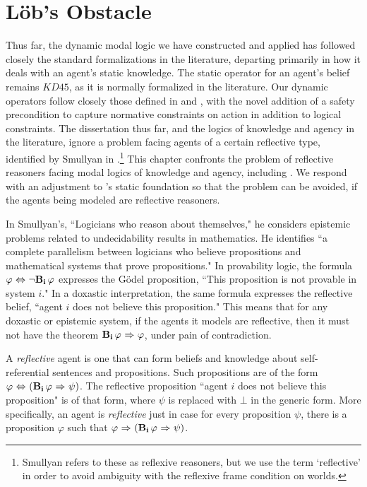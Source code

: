 \chapter{L\"ob's Obstacle}
	\label{CH_05}

Thus far, the dynamic modal logic we have constructed and applied has followed closely the standard formalizations in the literature, departing primarily in how it deals with an agent's static knowledge. The static operator for an agent's belief remains $\mathit{KD}45$, as it is normally formalized in the literature. Our dynamic operators follow closely those defined in \cite{DEL} and \cite{PAL}, with the novel addition of a safety precondition to capture normative constraints on action in addition to logical constraints. The dissertation thus far, and the logics of knowledge and agency in the literature, ignore a problem facing agents of a certain reflective type, identified by Smullyan in \cite{smullyan}.\footnote{Smullyan refers to these as reflexive reasoners, but we use the term `reflective' in order to avoid ambiguity with the reflexive frame condition on worlds.} This chapter confronts the problem of reflective reasoners facing modal logics of knowledge and agency, including \DASL. We respond with an adjustment to \DASL's static foundation so that the problem can be avoided, if the agents being modeled are reflective reasoners.

In Smullyan's, ``Logicians who reason about themselves," he considers epistemic problems related to undecidability results in mathematics. He identifies ``a complete parallelism between logicians who believe propositions and mathematical systems that prove propositions." In provability logic, the formula $\varphi {\ \Leftrightarrow \ } {\neg} \mathbf{B}_{\mathbf{i}}\,\varphi$ expresses the G\"odel proposition, ``This proposition is not provable in system $i$." In a doxastic interpretation, the same formula expresses the reflective belief, ``agent $i$ does not believe this proposition." This means that for any doxastic or epistemic system, if the agents it models are reflective, then it must not have the theorem $\mathbf{B}_{\mathbf{i}}\,\varphi {\ \Rightarrow \ } \varphi$, under pain of contradiction. 

A \emph{reflective} agent is one that can form beliefs and knowledge about self-referential sentences and propositions. Such propositions are of the form $\varphi {\ \Leftrightarrow \ } (\mathbf{B}_{\mathbf{i}}\,\varphi {\ \Rightarrow \ } \psi)$. The reflective proposition ``agent $i$ does not believe this proposition" is of that form, where $\psi$ is replaced with $\bot$ in the generic form. More specifically, an agent is \emph{reflective} just in case for every proposition $\psi$, there is a proposition $\varphi$ such that $\varphi {\ \Rightarrow \ } (\mathbf{B}_{\mathbf{i}}\,\varphi {\ \Rightarrow \ } \psi)$.

